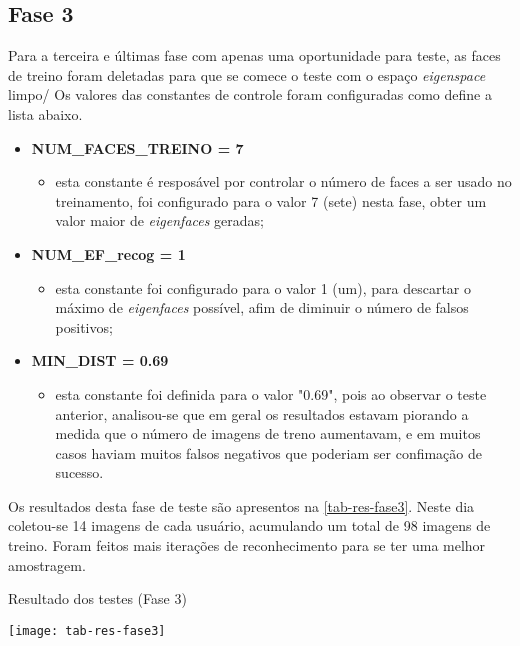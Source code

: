 \subsection{Fase 3}\label{ch:testresultfaz3}
Para a terceira e últimas fase com apenas uma oportunidade para teste, as faces de treino foram deletadas para que se comece o teste com o espaço \textit{eigenspace} limpo/ Os valores das constantes de controle foram configuradas como define a lista abaixo.

\begin{itemize}	
	\item \textbf{NUM\_FACES\_TREINO = 7}
	\begin{itemize}	
		\item esta constante é resposável por controlar o número de faces a ser usado no treinamento, foi configurado para o valor 7 (sete) nesta fase, obter um valor maior de \textit{eigenfaces} geradas;
	\end{itemize}
	
	\item \textbf{NUM\_EF\_recog = 1}
	\begin{itemize}	
		\item esta constante foi configurado para o valor 1 (um), para descartar o máximo de \textit{eigenfaces} possível, afim de diminuir o número de falsos positivos;
	\end{itemize}
	
	\item \textbf{MIN\_DIST = 0.69}
	\begin{itemize}	
		\item esta constante foi definida para o valor "0.69", pois ao observar o teste anterior, analisou-se que em geral os resultados estavam piorando a medida que o número de imagens de treno aumentavam, e em muitos casos haviam muitos falsos negativos que poderiam ser confimação de sucesso.
	\end{itemize}
\end{itemize}

Os resultados desta fase de teste são apresentos na \autoref{tab-res-fase3}. Neste dia coletou-se 14 imagens de cada usuário, acumulando um total de 98 imagens de treino. Foram feitos mais iterações de reconhecimento para se ter uma melhor amostragem.

\begin{table}[h]
	\centering
	\caption{Resultado dos testes (Fase 3) }
	\texttt{[image: tab-res-fase3]}
	\label{tab-res-fase3}
\end{table}






